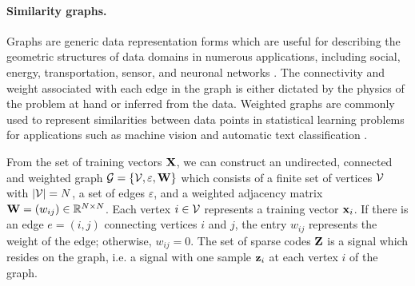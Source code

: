 \paragraph{Similarity graphs.}
Graphs are generic data representation forms which are useful for describing the geometric structures of data domains in numerous applications, including social, energy, transportation, sensor, and neuronal networks \cite{pierre2013graphs}. The connectivity and weight associated with each edge in the graph is either dictated by the physics of the problem at hand or inferred from the data.
Weighted graphs are commonly used to represent similarities between data points in statistical learning problems for applications such as machine vision \cite{lowe1999graphSimilarity} and automatic text classification \cite{apte1994graphSimilarity}.



From the set of training vectors $\mathbf{X}$, we can construct an undirected, connected and weighted graph $\mathcal{G} = \{ \mathcal{V}, \varepsilon, \mathbf{W} \}$ which consists of a finite set of vertices $\mathcal{V}$ with $|\mathcal{V}| = N$, a set of edges $\varepsilon$, and a weighted adjacency matrix $\mathbf{W} = (w_{ij}) \in \mathbb{R}^{N \times N}$. Each vertex $i \in \mathcal{V}$ represents a training vector $\mathbf{x}_i$. If there is an edge $e = (i, j)$ connecting vertices $i$ and $j$, the entry $w_{ij}$ represents the weight of the edge; otherwise, $w_{ij} = 0$. The set of sparse codes $\mathbf{Z}$ is a signal which resides on the graph, i.e. a signal with one sample $\mathbf{z}_i$ at each vertex $i$ of the graph.

